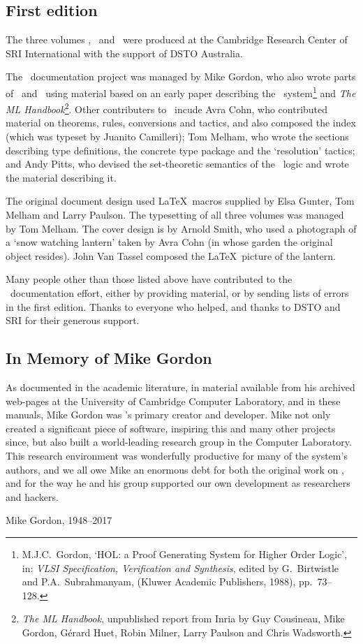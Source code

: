 \subsection*{First edition}

The three volumes \TUTORIAL, \DESCRIPTION\ and \REFERENCE\ were
produced at the Cambridge Research Center of SRI International with
the support of DSTO Australia.

The \HOL\ documentation project was managed by Mike Gordon, who also
wrote parts of \DESCRIPTION\ and \TUTORIAL\ using material based on an
early paper describing the \HOL\ system\footnote{M.J.C.\ Gordon, `HOL:
  a Proof Generating System for Higher Order Logic', in: {\it VLSI
    Specification, Verification and Synthesis\/}, edited by G.\
  Birtwistle and P.A.\ Subrahmanyam, (Kluwer Academic Publishers,
  1988), pp.\ 73--128.} and {\sl The ML Handbook\/}\footnote{{\sl The
    ML Handbook}, unpublished report from Inria by Guy Cousineau, Mike
  Gordon, G\'erard Huet, Robin Milner, Larry Paulson and Chris
  Wadsworth.}.  Other contributers to \DESCRIPTION\ incude Avra Cohn,
who contributed material on theorems, rules, conversions and tactics,
and also composed the index (which was typeset by Juanito Camilleri);
Tom Melham, who wrote the sections describing type definitions, the
concrete type package and the `resolution' tactics; and Andy Pitts,
who devised the set-theoretic semantics of the \HOL\ logic and wrote
the material describing it.

The original document design used \LaTeX\ macros supplied by Elsa
Gunter, Tom Melham and Larry Paulson.  The typesetting of all three
volumes was managed by Tom Melham.  The cover design is by Arnold
Smith, who used a photograph of a `snow watching lantern' taken by
Avra Cohn (in whose garden the original object resides).  John Van
Tassel composed the \LaTeX\ picture of the lantern.

Many people other than those listed above have contributed to the
\HOL\ documentation effort, either by providing material, or by
sending lists of errors in the first edition.  Thanks to everyone who
helped, and thanks to DSTO and SRI for their generous support.

\newpage
\subsection*{In Memory of Mike Gordon}

As documented in the academic literature, in material available from his archived web-pages at the University of Cambridge Computer Laboratory, and in these manuals, Mike Gordon was \HOL's primary creator and developer.
Mike not only created a significant piece of software, inspiring this and many other projects since, but also built a world-leading research group in the Computer Laboratory.
This research environment was wonderfully productive for many of the system's authors, and we all owe Mike an enormous debt for both the original work on \HOL, and for the way he and his group supported our own development as researchers and \HOL{} hackers.

\bigskip
\begin{center}
Mike Gordon, 1948--2017
\end{center}
